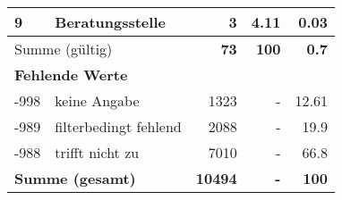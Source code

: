 \begin{longtable}{lXrrr}
     9 &
     \multicolumn{1}{X}{ Beratungsstelle   } &


       \num{3} &
       \num[round-mode=places,round-precision=2]{4.11} &
         \num[round-mode=places,round-precision=2]{0.03} \\
     \midrule
     \multicolumn{2}{l}{Summe (gültig)} &
       \textbf{\num{73}} &
     \textbf{\num{100}} &
       \textbf{\num[round-mode=places,round-precision=2]{0.7}} \\
     \multicolumn{5}{l}{\textbf{Fehlende Werte}}\\
       -998 &
       keine Angabe &
         \num{1323} &
        - &
         \num[round-mode=places,round-precision=2]{12.61} \\
       -989 &
       filterbedingt fehlend &
         \num{2088} &
        - &
         \num[round-mode=places,round-precision=2]{19.9} \\
       -988 &
       trifft nicht zu &
         \num{7010} &
        - &
         \num[round-mode=places,round-precision=2]{66.8} \\
     \midrule
     \multicolumn{2}{l}{\textbf{Summe (gesamt)}} &
          \textbf{\num{10494}} &
        \textbf{-} &
        \textbf{\num{100}} \\
     \bottomrule
     \end{longtable}
     
